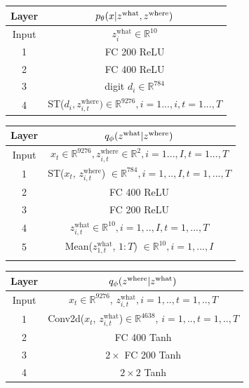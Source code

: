 \documentclass[anonymous=false, %
               format=acmsmall, %
               review=true, %
               screen=true, %
               nonacm=true]{acmart}
\theoremstyle{definition}
\begin{document}
\begin{table}[h]
\centering
\label{arch-bmnist-decoder}
\begin{tabular}{c|c}
    \toprule
    \textbf{Layer} & $p_\theta(x | z^{\mathrm{what}}, z^{\mathrm{where}})$ \\
    \midrule
    Input & $z^{\mathrm{what}}_i \in\mathbb{R}^{10}$
    \\
    \hline
    1 &
    FC 200 ReLU \\
    \hline
    2 &
    FC 400 ReLU \\
    \hline
    3 & digit $d_i\in\mathbb{R}^{784}$\\
    \hline
    4 & ST($d_{i}, z^{\mathrm{where}}_{i, t}) \in\mathbb{R}^{9276}, i=1...,i, t=1...,T$ \\
    \bottomrule
\end{tabular}
\end{table}

\begin{table}[h]
\centering
\begin{tabular}{c|c}
    \toprule
    \textbf{Layer} & $q_\phi(z^{\mathrm{what}} | z^{\mathrm{where}})$ \\
    \midrule
    Input & $x_t\in\mathbb{R}^{9276}, z^{\mathrm{where}}_{i, t}\in\mathbb{R}^{2}, i=1...,I, t=1...,T$
    \\
    \hline
    1 & 
    ST($x_t$, $z^{\mathrm{where}} _{i, t}$) $\in\mathbb{R}^{784}, i=1,..,I, t=1,...,T$  \\
    \hline
    2 &
    FC 400 ReLU \\
    \hline
    3 &
    FC 200 ReLU \\
    \hline
    4 & $z^{\mathrm{what}}_{i, t} \in\mathbb{R}^{10}, i=1,..,I, t=1,...,T$  \\
    \hline
    5 &
    Mean($z^{\mathrm{what}}_{1, t}$, $1:T$) $\in\mathbb{R}^{10}, i=1,...,I$\\
    \bottomrule
    \label{arch-bmnist-enc-what}
\end{tabular}
\end{table}

\begin{table}[h]
    \centering
    \begin{tabular}{c|c}
     \toprule
    \textbf{Layer} & $q_\phi(z^{\mathrm{where}} | z^{\mathrm{what}})$ \\
    \midrule
    Input &
    $x_t\in\mathbb{R}^{9276}$, $z^{\mathrm{what}}_{i, t}, i=1,.., t=1,..,T$ \\
    \hline
    1 & 
    Conv2d($x_t$, $z^{\mathrm{what}}_{i, t}$)$\in\mathbb{R}^{4638}$, $i=1,.., t=1,..,T$ \\
    \hline
    2  &
    FC 400 Tanh \\
    \hline
    3 & $2\times$ FC 200 Tanh \\
    \hline
    4 &
    $2\times2$ Tanh 
    \\
    \bottomrule
    \end{tabular}
    \label{arch-bmnist-enc-where}
\end{table}
\end{document}
